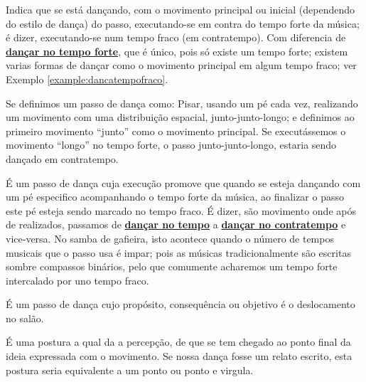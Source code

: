 \begin{definition} 
\label{def:DancaNoContratempo}
Indica que se está dançando, com o movimento principal ou inicial (dependendo do estilo de dança) do passo, 
executando-se em contra do tempo forte da música; é dizer, executando-se num tempo fraco (em contratempo).
Com diferencia de \hyperref[def:DancaNoTempo]{\textbf{dançar no tempo forte}}, 
que é único, pois só existe um tempo forte;
existem varias formas de dançar como o movimento principal em algum tempo fraco; ver Exemplo \ref{example:dancatempofraco}.
\end{definition}
\begin{example}
\label{example:dancatempofraco}
Se definimos um passo de dança como: Pisar, usando um pé cada vez, 
realizando um movimento com uma distribuição espacial, junto-junto-longo;
e definimos ao primeiro movimento ``junto'' como o movimento principal. 
Se executássemos o movimento ``longo'' no tempo forte, o passo junto-junto-longo,
estaria sendo dançado em contratempo.
\end{example}

\begin{definition} 
\label{def:PassoAContratempo}
É um passo de dança cuja execução promove que quando se esteja dançando com um pé especifico acompanhando o tempo forte da música,
ao finalizar o passo este pé esteja sendo marcado no tempo fraco.
É dizer, são movimento onde após de realizados, 
passamos de \hyperref[def:DancaNoTempo]{\textbf{dançar no tempo}} a 
\hyperref[def:DancaNoContratempo]{\textbf{dançar no contratempo}} e vice-versa. 
No samba de gafieira, isto acontece quando o número de tempos musicais que o passo  usa é impar;
pois as músicas tradicionalmente são escritas sombre compassos binários, 
pelo que comumente acharemos um tempo forte intercalado por uno tempo fraco.
\end{definition}

\begin{definition} 
\label{def:PassoDeDeslocamento}
É um passo de dança cujo propósito, consequência ou objetivo é o deslocamento no salão.
\end{definition}

\begin{definition} 
\label{def:PosturaFinaliza}
É uma postura a qual da a percepção, 
de que se tem chegado ao ponto final da ideia expressada com o movimento.
Se nossa dança fosse um relato escrito, esta postura seria equivalente a um ponto ou ponto e virgula.
\end{definition}

